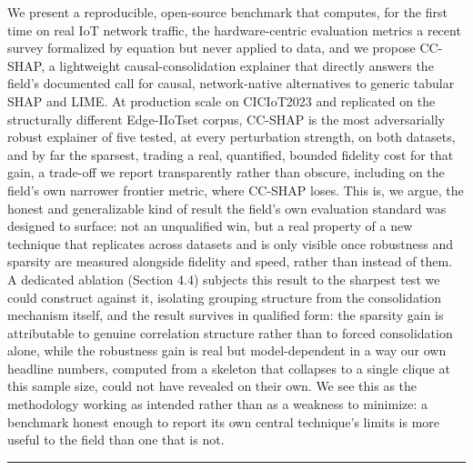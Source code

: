 We present a reproducible, open-source benchmark that computes, for the first time on real IoT network traffic, the hardware-centric evaluation metrics a recent survey formalized by equation but never applied to data, and we propose CC-SHAP, a lightweight causal-consolidation explainer that directly answers the field's documented call for causal, network-native alternatives to generic tabular SHAP and LIME. At production scale on CICIoT2023 and replicated on the structurally different Edge-IIoTset corpus, CC-SHAP is the most adversarially robust explainer of five tested, at every perturbation strength, on both datasets, and by far the sparsest, trading a real, quantified, bounded fidelity cost for that gain, a trade-off we report transparently rather than obscure, including on the field's own narrower frontier metric, where CC-SHAP loses. This is, we argue, the honest and generalizable kind of result the field's own evaluation standard was designed to surface: not an unqualified win, but a real property of a new technique that replicates across datasets and is only visible once robustness and sparsity are measured alongside fidelity and speed, rather than instead of them. A dedicated ablation (Section 4.4) subjects this result to the sharpest test we could construct against it, isolating grouping structure from the consolidation mechanism itself, and the result survives in qualified form: the sparsity gain is attributable to genuine correlation structure rather than to forced consolidation alone, while the robustness gain is real but model-dependent in a way our own headline numbers, computed from a skeleton that collapses to a single clique at this sample size, could not have revealed on their own. We see this as the methodology working as intended rather than as a weakness to minimize: a benchmark honest enough to report its own central technique's limits is more useful to the field than one that is not.

\begin{center}\rule{0.5\linewidth}{0.5pt}\end{center}

